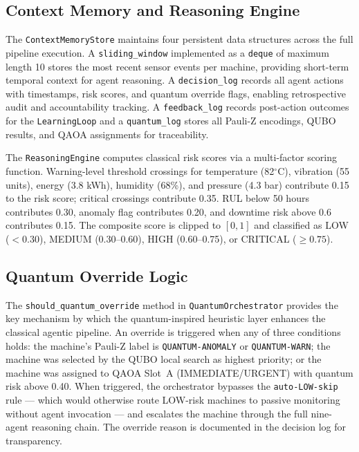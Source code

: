\subsection{Context Memory and Reasoning Engine}

The \texttt{ContextMemoryStore} maintains four persistent data structures across the full pipeline execution. A \texttt{sliding\_window} implemented as a \texttt{deque} of maximum length 10 stores the most recent sensor events per machine, providing short-term temporal context for agent reasoning. A \texttt{decision\_log} records all agent actions with timestamps, risk scores, and quantum override flags, enabling retrospective audit and accountability tracking. A \texttt{feedback\_log} records post-action outcomes for the \texttt{LearningLoop} and a \texttt{quantum\_log} stores all Pauli-Z encodings, QUBO results, and QAOA assignments for traceability.

The \texttt{ReasoningEngine} computes classical risk scores via a multi-factor scoring function. Warning-level threshold crossings for temperature (82$^\circ$C), vibration (55 units), energy (3.8 kWh), humidity (68\%), and pressure (4.3 bar) contribute 0.15 to the risk score; critical crossings contribute 0.35. RUL below 50 hours contributes 0.30, anomaly flag contributes 0.20, and downtime risk above 0.6 contributes 0.15. The composite score is clipped to $[0,1]$ and classified as LOW ($<0.30$), MEDIUM (0.30--0.60), HIGH (0.60--0.75), or CRITICAL ($\geq0.75$).

\subsection{Quantum Override Logic}

The \texttt{should\_quantum\_override} method in \texttt{QuantumOrchestrator} provides the key mechanism by which the quantum-inspired heuristic layer enhances the classical agentic pipeline. An override is triggered when any of three conditions holds: the machine's Pauli-Z label is \texttt{QUANTUM-ANOMALY} or \texttt{QUANTUM-WARN}; the machine was selected by the QUBO local search as highest priority; or the machine was assigned to QAOA Slot~A (IMMEDIATE/URGENT) with quantum risk above 0.40. When triggered, the orchestrator bypasses the \texttt{auto-LOW-skip} rule --- which would otherwise route LOW-risk machines to passive monitoring without agent invocation --- and escalates the machine through the full nine-agent reasoning chain. The override reason is documented in the decision log for transparency.


